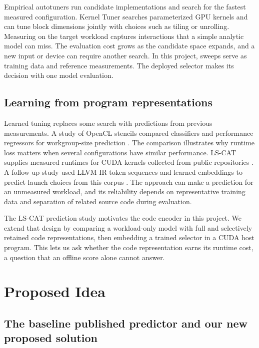 \documentclass[11pt,letterpaper]{article}
\begin{document}
Empirical autotuners run candidate implementations and search for the fastest measured configuration. Kernel
Tuner \citep{vanwerkhoven2019} searches parameterized GPU kernels and can tune block dimensions jointly with
choices such as tiling or unrolling. Measuring on the target workload captures interactions that a simple
analytic model can miss. The evaluation cost grows as the candidate space expands, and a new input or device
can require another search. In this project, sweeps serve as training data and reference measurements. The
deployed selector makes its decision with one model evaluation.

\subsection{Learning from program representations}

Learned tuning replaces some search with predictions from previous measurements. A study of OpenCL stencils
compared classifiers and performance regressors for workgroup-size prediction \citep{cummins2016}. The
comparison illustrates why runtime loss matters when several configurations have similar performance. LS-CAT
supplies measured runtimes for CUDA kernels collected from public repositories \citep{bjertnes2021a}. A
follow-up study used LLVM IR token sequences and learned embeddings to predict launch choices from this
corpus \citep{bjertnes2021b}. The approach can make a prediction for an unmeasured workload, and its
reliability depends on representative training data and separation of related source code during evaluation.

The LS-CAT prediction study motivates the code encoder in this project. We extend that design by comparing a
workload-only model with full and selectively retained code representations, then embedding a trained
selector in a CUDA host program. This lets us ask whether the code representation earns its runtime cost, a
question that an offline score alone cannot answer.

\section{Proposed Idea}

\subsection{The baseline published predictor and our new proposed solution}
\end{document}
